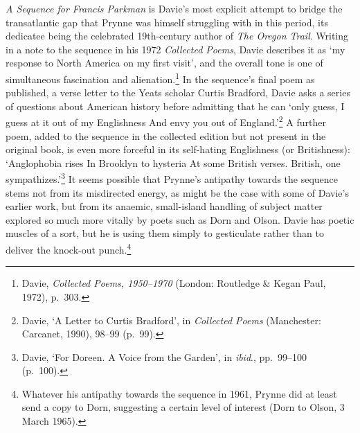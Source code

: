 \documentclass[]{article}
\begin{document}
\emph{A Sequence for Francis Parkman} is Davie's most explicit attempt
to bridge the transatlantic gap that Prynne was himself struggling with
in this period, its dedicatee being the celebrated 19th-century author
of \emph{The Oregon Trail}. Writing in a note to the sequence in his
1972 \emph{Collected Poems}, Davie describes it as `my response to North
America on my first visit', and the overall tone is one of simultaneous
fascination and alienation.\footnote{Davie, \emph{Collected Poems,
  1950--1970} (London: Routledge \& Kegan Paul, 1972), p.~303.} In the
sequence's final poem as published, a verse letter to the Yeats scholar
Curtis Bradford, Davie asks a series of questions about American history
before admitting that he can `only guess, \textbar{} I guess at it out
of my Englishness \textbar{} And envy you out of England.'\footnote{Davie,
  `A Letter to Curtis Bradford', in \emph{Collected Poems} (Manchester:
  Carcanet, 1990), 98--99 (p.~99).} A further poem, added to the
sequence in the collected edition but not present in the original book,
is even more forceful in its self-hating Englishness (or Britishness):
`Anglophobia rises \textbar{} In Brooklyn to hysteria \textbar{} At some
British verses. \textbar{} British, one sympathizes.'\footnote{Davie,
  `For Doreen. A Voice from the Garden', in \emph{ibid}., pp.~99--100
  (p.~100).} It seems possible that Prynne's antipathy towards the
sequence stems not from its misdirected energy, as might be the case
with some of Davie's earlier work, but from its anaemic, small-island
handling of subject matter explored so much more vitally by poets such
as Dorn and Olson. Davie has poetic muscles of a sort, but he is using
them simply to gesticulate rather than to deliver the knock-out
punch.\footnote{Whatever his antipathy towards the sequence in 1961,
  Prynne did at least send a copy to Dorn, suggesting a certain level of
  interest (Dorn to Olson, 3 March 1965).}
\end{document}
